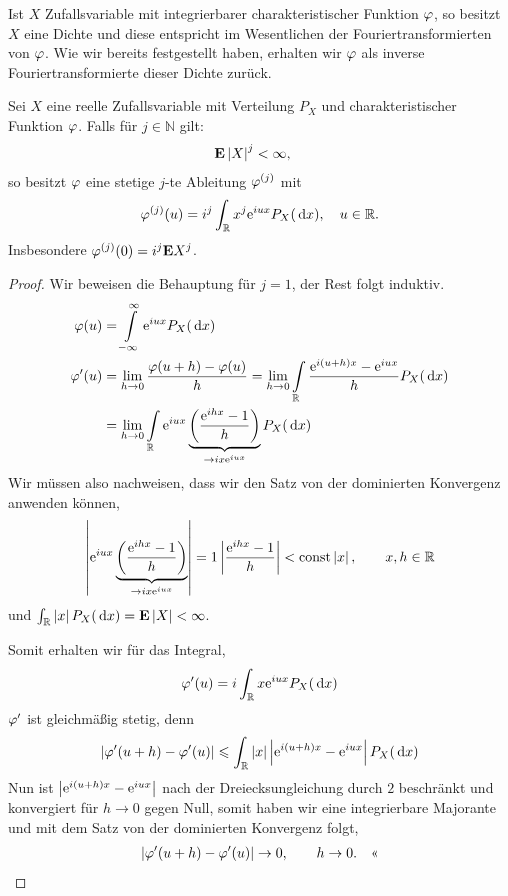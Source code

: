 Ist $X$ Zufallsvariable mit integrierbarer charakteristischer Funktion $\varphi$,
so besitzt $X$ eine Dichte und diese entspricht im Wesentlichen der
Fouriertransformierten von $\varphi$. Wie wir bereits festgestellt haben, erhalten
wir $\varphi$ als inverse Fouriertransformierte dieser Dichte zurück.

\begin{prop}
\label{prop:6.6}
Sei $X$ eine reelle Zufallsvariable mit Verteilung $P_{X}$ und
charakteristischer Funktion $\varphi $. Falls für $j\in \mathbb{N}$ gilt:
\begin{align*}
&\textbf{E}\left|X\right|^{j} < \infty,
\end{align*}
so besitzt $\varphi$
eine stetige $j$-te Ableitung
$\varphi^{(j)}$ mit
\begin{align*}
\varphi^{(j)}(u) = i^{j}\int_{\mathbb{R}}
x^ {j} \mathrm{e}^ {iux} P_{X}(\,\mathrm{d} x),\quad u\in \mathbb{R}.
\end{align*}
Insbesondere $\varphi^{(j)} (0) = i^ {j} \textbf{E} X^ {j}$.\fishhere
\end{prop}

\begin{proof}
Wir beweisen die Behauptung für $j=1$, der Rest folgt induktiv.
\begin{align*}
\varphi(u) &= \int\limits_{-\infty}^\infty \mathrm{e}^{iux}P_X(\,\mathrm{d} x)\\
\varphi'(u) &= \lim\limits_{h\to0} \frac{\varphi(u+h)-\varphi(u)}{h}
= \lim\limits_{h\to 0}\int\limits_{\mathbb{R}} \frac{\mathrm{e}^{i(u+h)x}-\mathrm{e}^{iux}}{h} P_X(\,\mathrm{d} x)\\
&= \lim\limits_{h\to 0}\int\limits_{\mathbb{R}}
\mathrm{e}^{iux}\underbrace{\left(\frac{\mathrm{e}^{ihx}-1}{h}\right)}_{\to ix\mathrm{e}^{iux}} P_X(\,\mathrm{d} x)
\end{align*}
Wir müssen also nachweisen, dass wir den Satz von der dominierten Konvergenz
anwenden können,
\begin{align*}
\left|\mathrm{e}^{iux}\underbrace{\left(\frac{\mathrm{e}^{ihx}-1}{h}\right)}_{\to ix\mathrm{e}^{iux}}\right| = 1
\left|\frac{\mathrm{e}^{ihx}-1}{h}\right| < \mathrm{const}\left|x\right|,\qquad x,h\in\mathbb{R}
\end{align*}
und $\int_{\mathbb{R}} \left|x\right|P_X(\,\mathrm{d} x) = \textbf{E} \left|X\right| < \infty$.

Somit erhalten wir für das Integral,
\begin{align*}
\varphi'(u) = i\int_{\mathbb{R}} x \mathrm{e}^{iux}P_X(\,\mathrm{d} x)
\end{align*}
$\varphi'$ ist gleichmäßig stetig, denn
\begin{align*}
\left|\varphi'(u+h)-\varphi'(u)\right| \leqslant \int_{\mathbb{R}} \left|x\right|\left|\mathrm{e}^{i(u+h)x}-\mathrm{e}^{iux}\right|P_X(\,\mathrm{d} x)
\end{align*}
Nun ist $\left|\mathrm{e}^{i(u+h)x}-\mathrm{e}^{iux}\right|$ nach der Dreiecksungleichung durch $2$
beschränkt und konvergiert für $h\to 0$ gegen Null, somit haben wir eine
integrierbare Majorante und mit dem Satz von der dominierten Konvergenz folgt,
\begin{align*}
\left|\varphi'(u+h)-\varphi'(u)\right| \to 0,\qquad h\to 0.\quad\text{<<}
\end{align*} 
\end{proof}

